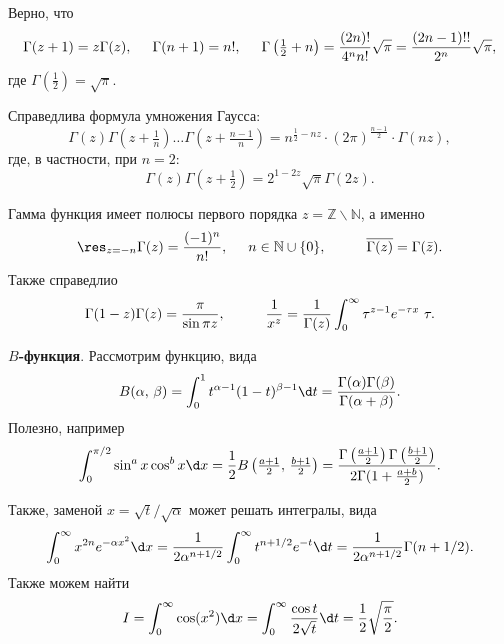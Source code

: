 Верно, что
\begin{equation*}
    \Gamma(z+1) = z \Gamma(z),
    \hspace{5 mm} 
    \Gamma(n+1) = n!,
    \hspace{5 mm} 
    \Gamma\left(\tfrac{1}{2}+n\right) = 
    \frac{(2n)!}{4^n n!} \sqrt{\pi} = \frac{(2n-1)!!}{2^n} \sqrt{\pi},
\end{equation*}
где $\Gamma(\tfrac{1}{2}) = \sqrt{\pi}$. 

Справедлива формула умножения Гаусса:
\begin{equation*}
    \Gamma(z) \Gamma\left(z + \tfrac{1}{n}\right) \ldots \Gamma\left(z + \tfrac{n-1}{n}\right) = n^{\frac{1}{2} - nz} \cdot (2\pi)^{\frac{n-1}{2}} \cdot \Gamma(nz),
\end{equation*}
где, в частности, при $n=2$:
\begin{equation*}
    \Gamma(z) \Gamma\left(z + \tfrac{1}{2}\right) = 2^{1-2z} \sqrt{\pi} \Gamma(2z).
\end{equation*}


Гамма функция имеет полюсы первого порядка  $z = \mathbb{Z}\backslash \mathbb{N}$, а именно
\begin{equation*}
    \res_{z=-n} \Gamma(z) = \frac{(-1)^n}{n!},
    \hspace{5 mm} n \in \mathbb{N}\cup \{0\},
    \hspace{10 mm} 
    \overline{\Gamma(z)} = \Gamma(\bar{z}).
\end{equation*}
Также справедлио
\begin{equation*}
    \Gamma(1-z) \Gamma(z) = \frac{\pi}{\sin \pi z},
    \hspace{10 mm} 
    \frac{1}{x^z} = \frac{1}{\Gamma(z)} \int_{0}^{\infty} \tau^{z-1} e^{- \tau x} \ \tau.
\end{equation*}


\textbf{$B$-функция}. Рассмотрим функцию, вида
\begin{equation*}
    B(\alpha,\, \beta) = \int_{0}^{1} t^{\alpha-1} (1-t)^{\beta-1} \d t = \frac{\Gamma(\alpha) \Gamma(\beta)}{\Gamma(\alpha + \beta)}.
\end{equation*}
Полезно, например
\begin{equation*}
    \int_{0}^{\pi/2} \sin^a x \cos^b x \d x = 
    \frac{1}{2} B\left(\tfrac{a+1}{2},\, \tfrac{b+1}{2}\right) = 
    \frac{\Gamma\left(\frac{a+1}{2}\right) \Gamma\left(\frac{b+1}{2}\right)}{2 \Gamma(1 + \frac{a+b}{2})} .
\end{equation*}

Также, заменой $x = \sqrt{t}/\sqrt{\alpha}$ может решать интегралы, вида
\begin{equation*}
    \int_{0}^{\infty} x^{2n} e^{-\alpha x^2} \d x = \frac{1}{2 \alpha^{n+1/2}} \int_{0}^{\infty} t^{n+1/2} e^{-t} \d t = \frac{1}{2 \alpha^{n + 1/2}} \Gamma(n+1/2).
\end{equation*} 
Также можем найти
\begin{equation*}
    I = \int_{0}^{\infty} \cos (x^2) \d x = \int_{0}^{\infty} \frac{\cos t}{2 \sqrt{t}} \d t = \frac{1}{2} \sqrt{\frac{\pi}{2}}.
\end{equation*}


